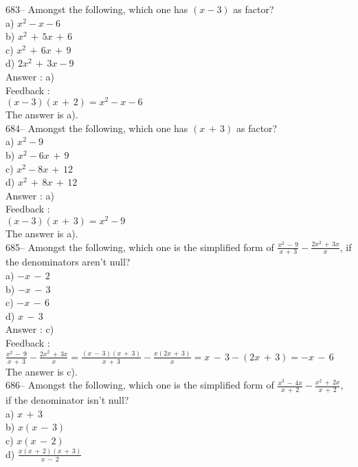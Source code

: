 \documentclass[letterpaper, 12pt]{article}
\begin{document}
683-- Amongst the following, which one has $\left( x-3\right)$ as factor?\\
a) $x^{2}-x-6$\\
b) $x^{2}\,+\,5x\,+\,6$\\
c) $x^{2}\,+\,6x\,+\,9$\\
d) $2x^{2}\,+\,3x-9$\\

Answer : a)\\

Feedback : \\
$(x-3)(x\,+\,2)=x^{2}-x-6$\\
The answer is a).\\

684-- Amongst the following, which one has
$\left( x\,+\,3\right) $ as factor?\\
a) $x^{2}-9$\\
b) $x^{2}-6x\,+\,9$\\
c) $x^{2}-8x\,+\,12$\\
d) $x^{2}\,+\,8x\,+\,12$\\

Answer : a)\\

Feedback : \\
$\left( x-3\right) \left( x\,+\,3\right) = x^{2}-9$\\
The answer is a).\\

685-- Amongst the following, which one is the simplified form of $\frac{x^{2}\,-\,9}{x\,+\,3}-\frac{2x^{2}\,+\,3x}{x}$, if the denominators aren't null?\\
a) $-x\,-\,2$\\
b) $-x\,-\,3$\\
c) $-x\,-\,6$\\
d) $x\,-\,3$\\

Answer : c)\\

Feedback : \\[2mm]
$\frac{x^{2}\,-\,9}{x\,+\,3}-\frac{2x^{2}\,+\,3x}{x}=\frac{\left(
x\,-\,3\right) \left( x\,+\,3\right) }{x\,+\,3} -\frac{x\left(
2x\,+\,3\right) }{x}=x\,-\,3-\left( 2x\,+\,3\right) =-x\,-\,6$\\[2mm]
The answer is c).\\

686-- Amongst the following, which one is the simplified form of $\frac{x^{3}\,-\,4x}{x\,+\,2}-\frac{x^{2}\,+\,2x}{x\,+\,2}$,
if the denominator isn't null?\\
a) $ x\,+\,3$\\[2mm]
b) $x\left( x\,-\,3\right) $\\[2mm]
c) $x\left( x\,-\,2\right) $\\[2mm]
d) $\frac{x\left( x\,+\,2\right) \left( x\,+\,3\right)}{x\,-\,2}$\\
\end{document}
